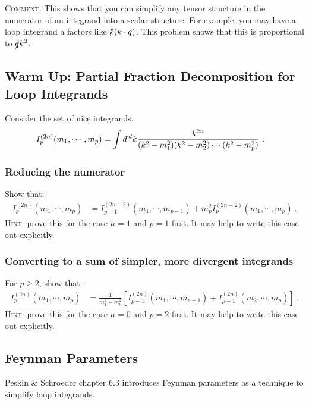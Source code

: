 \documentclass[12pt]{article}
\numberwithin{equation}{subsection}    %
\newcommand{\dbar}{d\mkern-6mu\mathchar'26}    %
\begin{document}
\textsc{Comment}: This shows that you can simplify any tensor structure in the numerator of an integrand into a scalar structure. For example, you may have a loop integrand a factors like $\slashed{k} (k\cdot q)$. This problem shows that this is proportional to $\slashed{q} k^2$. 


\subsection{Warm Up: Partial Fraction Decomposition for Loop Integrands}
\label{probl:partial:fraction}

Consider the set of nice integrands,
\begin{align}
	I^{(2n)}_p(m_1,\cdots,m_p)
	&= 
	\int \dbar^d k
	\frac{k^{2n}}{(k^2-m_1^2)(k^2-m_2^2)\cdots (k^2-m_p^2)} \ .
\end{align}

\subsubsection{Reducing the numerator}

Show that:
\begin{align}
	I^{(2n)}_p(m_1,\cdots,m_p)
	&= 
	I^{(2n-2)}_{p-1}(m_1,\cdots,m_{p-1})
	+
	m_p^2 
	I^{(2n-2)}_p(m_1,\cdots,m_{p})\ .
\end{align}
\textsc{Hint}: prove this for the case $n=1$ and $p=1$ first. It may help to write this case out explicitly.


\subsubsection{Converting to a sum of simpler, more divergent integrands}
For $p\geq 2$, show that:
\begin{align}
	I^{(2n)}_p(m_1,\cdots,m_p)
	&= 
	\frac{1}{m_1^2 - m_p^2}
	\left[
	I^{(2n)}_{p-1}(m_1,\cdots,m_{p-1})
	+
	I^{(2n)}_{p-1}(m_2,\cdots,m_{p})
	\right] \ .
\end{align}
\textsc{Hint}: prove this for the case $n=0$ and $p=2$ first. It may help to write this case out explicitly.




\subsection{Feynman Parameters}
Peskin \& Schroeder chapter 6.3 introduces Feynman parameters as a technique to simplify loop integrands.
\end{document}
